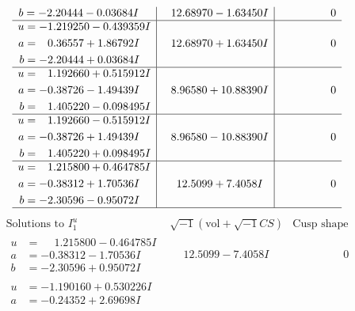 \documentclass[1p]{elsarticle_modified}
\theoremstyle{definition}
\newcommand{\I}{\sqrt{-1}}
\begin{document}
$$\begin{array}{c|c|c}
\begin{aligned}
b &= -2.20444 - 0.03684 I\end{aligned}
 & \phantom{-}12.68970 - 1.63450 I & \phantom{-0.000000 } 0 \\ \hline\begin{aligned}
u &= -1.219250 - 0.439359 I \\
a &= \phantom{-}0.36557 + 1.86792 I \\
b &= -2.20444 + 0.03684 I\end{aligned}
 & \phantom{-}12.68970 + 1.63450 I & \phantom{-0.000000 } 0 \\ \hline\begin{aligned}
u &= \phantom{-}1.192660 + 0.515912 I \\
a &= -0.38726 - 1.49439 I \\
b &= \phantom{-}1.405220 - 0.098495 I\end{aligned}
 & \phantom{-}8.96580 + 10.88390 I & \phantom{-0.000000 } 0 \\ \hline\begin{aligned}
u &= \phantom{-}1.192660 - 0.515912 I \\
a &= -0.38726 + 1.49439 I \\
b &= \phantom{-}1.405220 + 0.098495 I\end{aligned}
 & \phantom{-}8.96580 - 10.88390 I & \phantom{-0.000000 } 0 \\ \hline\begin{aligned}
u &= \phantom{-}1.215800 + 0.464785 I \\
a &= -0.38312 + 1.70536 I \\
b &= -2.30596 - 0.95072 I\end{aligned}
 & \phantom{-}12.5099 + 7.4058 I & \phantom{-0.000000 } 0\\
 \hline 
 \end{array}$$\newpage$$\begin{array}{c|c|c}  
\text{Solutions to }I^u_{1}& \I (\text{vol} + \sqrt{-1}CS) & \text{Cusp shape}\\
 \hline 
\begin{aligned}
u &= \phantom{-}1.215800 - 0.464785 I \\
a &= -0.38312 - 1.70536 I \\
b &= -2.30596 + 0.95072 I\end{aligned}
 & \phantom{-}12.5099 - 7.4058 I & \phantom{-0.000000 } 0 \\ \hline\begin{aligned}
u &= -1.190160 + 0.530226 I \\
a &= -0.24352 + 2.69698 I \\

\end{aligned}
\end{array}$$
\end{document}
